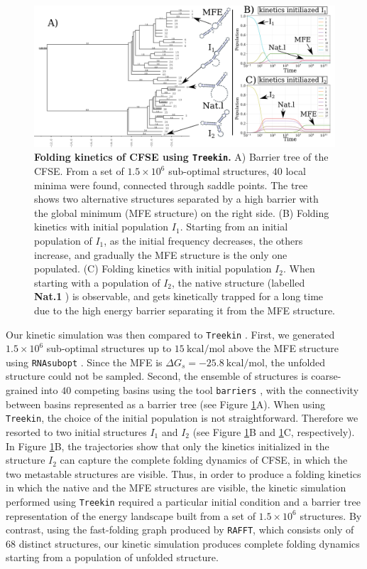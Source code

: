 \begin{figure}[t!]
	\centering
	\includegraphics[width=0.9\linewidth]{../res/images/rafft/kinetic_treekin.png}
	\caption{\label{treekin}\textbf{Folding kinetics of CFSE using \texttt{Treekin}. }A) Barrier tree of the CFSE. From a set of $1.5\times10^6$ sub-optimal structures, $40$ local minima were found,  connected through saddle points. The tree shows two alternative structures separated by a high barrier with the global minimum (MFE structure) on the right side. (B) Folding kinetics with initial population $I_1$. Starting from an initial population of $I_1$, as the initial frequency  decreases, the others increase, and gradually the MFE structure is the only one populated.  (C) Folding kinetics with initial population $I_2$. When starting with a population of $I_2$, the native structure (labelled \textbf{Nat.1} ) is observable, and gets kinetically trapped for a long time due to the high energy barrier separating it from the MFE structure.}
\end{figure}

Our kinetic simulation was then compared to \texttt{Treekin} \cite{flamm02_barrier_trees_degen_lands}. First, we generated \(1.5 \times 10^6\) sub-optimal structures up to $15 \ \textrm{kcal/mol}$ above the MFE structure using \texttt{RNAsubopt} \cite{lorenz11_vienn_packag}. Since the MFE is $\Delta G_s=-25.8 \ \textrm{kcal/mol}$, the unfolded structure could not be sampled. Second, the ensemble of structures is coarse-grained into $40$ competing basins using the tool \texttt{barriers} \cite{flamm02_barrier_trees_degen_lands}, with the connectivity between basins represented as a barrier tree (see Figure \ref{treekin}A). When using \texttt{Treekin}, the choice of the initial population is not straightforward. Therefore we resorted to two initial structures $I_1$ and $I_2$ (see Figure \ref{treekin}B and \ref{treekin}C, respectively). In Figure \ref{treekin}B, the trajectories show that only the kinetics initialized in the structure $I_2$ can capture the complete folding dynamics of CFSE, in which the two metastable structures are visible. Thus, in order to produce a folding kinetics in which the native and the MFE structures are visible, the kinetic simulation performed using \texttt{Treekin} required a particular initial condition and a barrier tree representation of the energy landscape built from a set of  $1.5 \times 10^6$ structures. By contrast, using the fast-folding graph produced by \texttt{RAFFT}, which consists only of $68$ distinct structures, our kinetic simulation produces complete folding dynamics starting from a population of unfolded structure.

